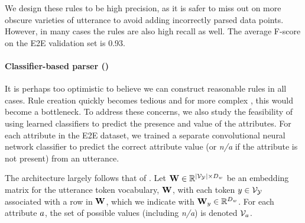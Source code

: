 We design these rules to be high precision, as it is safer to miss out on 
more obscure varieties of utterance to avoid adding incorrectly parsed data 
points.
However,  in many cases the rules are also high recall as well. 
The average F-score on the E2E validation set is 0.93.





\paragraph{Classifier-based parser (\learndmodel)} 

It is perhaps too optimistic to believe we can construct reasonable rules in
all cases. Rule creation quickly becomes tedious and for more complex
\meaningrepresentations, this would become a bottleneck. To address these
concerns, we also study the feasibility of using learned classifiers to
predict the presence and value of the attributes. For each attribute in the
E2E dataset, we trained a separate convolutional neural network 
classifier to predict the correct attribute value (or \textit{n/a} if the
attribute is not present) from an utterance.

The architecture largely follows that of \citet{kim2014convolutional}.  Let
$\mathbf{W} \in \mathbb{R}^{{\left\vert \mathcal{V}_{\mathcal{Y}} \right\vert} \times D_w}$ be an
embedding matrix for the utterance token vocabulary, $\mathbf{W}$, with each
token $y \in \mathcal{V}_{\mathcal{Y}}$ associated with a row in $\mathbf{W}$, which we
indicate with $\mathbf{W}_y \in \mathbb{R}^{D_w}$.  For each
attribute $a$, the set of possible values (including \textit{n/a}) is
denoted ${\mathcal{V}_{a}}$.

